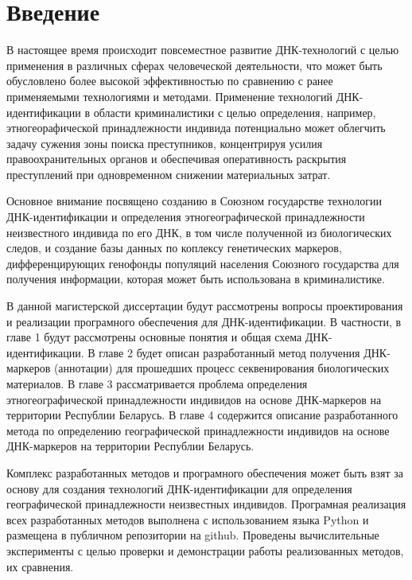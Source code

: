 \chapter*{Введение}

В настоящее время происходит повсеместное развитие ДНК-технологий с целью применения
в различных сферах человеческой деятельности, что может быть обусловлено более высокой
эффективностью по сравнению с ранее применяемыми технологиями и методами.
Применение технологий ДНК-идентификации в области криминалистики с целью определения,
например, этногеорафической принадлежности индивида потенциально может облегчить задачу сужения зоны поиска
преступников, концентрируя усилия правоохранительных органов и обеспечивая оперативность раскрытия преступлений
при одновременном снижении материальных затрат.

Основное внимание посвящено созданию в Союзном государстве технологии ДНК-идентификации и
определения этногеографической принадлежности неизвестного индивида по его ДНК,
в том числе полученной из биологических следов, и создание базы данных по коплексу генетических маркеров,
дифференцирующих генофонды популяций населения Союзного государства для получения информации, которая может быть
использована в криминалистике.

В данной магистерской диссертации будут рассмотрены вопросы проектирования и реализации
програмного обеспечения для ДНК-идентификации. В частности, в главе 1 будут рассмотрены основные понятия
и общая схема ДНК-идентификации. В главе 2 будет описан разработанный метод получения ДНК-маркеров (аннотации)
для прошедших процесс секвенирования биологических материалов. В главе 3 рассматривается проблема определения
этногеографической принадлежности индивидов на основе ДНК-маркеров на территории Республии Беларусь.
В главе 4 содержится описание разработанного метода по определению географической принадлежности
индивидов на основе ДНК-маркеров на территории Республии Беларусь.

Комплекс разработанных методов и програмного обеспечения может быть взят за основу для создания
технологий ДНК-идентификации для определения географической принадлежности неизвестных индивидов.
Програмная реализация всех разработанных методов выполнена с использованием языка Python
и размещена в публичном репозитории на github. Проведены вычислительные эксперименты с целью
проверки и демонстрации работы реализованных методов, их сравнения.
